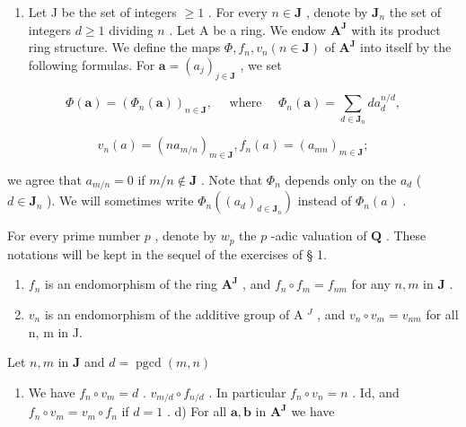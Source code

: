 \begin{enumerate}
\def\labelenumi{\arabic{enumi})}
\setcounter{enumi}{27}
\tightlist
\item
  Let J be the set of integers \(\geqslant 1\) . For every \(n \in \mathbf{J}\) , denote by \(\mathbf{J}_n\) the set of integers \(d \geqslant 1\) dividing \(n\) . Let A be a ring. We endow \(\mathbf{A}^{\mathbf{J}}\) with its product ring structure. We define the maps \(\Phi, f_n, v_n (n \in \mathbf{J})\) of \(\mathbf{A}^{\mathbf{J}}\) into itself by the following formulas. For \(\boldsymbol{a} = (a_j)_{j \in \mathbf{J}}\) , we set
\end{enumerate}

\[
\Phi (\boldsymbol {a}) = \left(\Phi_ {n} (\boldsymbol {a})\right) _ {n \in \mathbf {J}}, \quad \text { where } \quad \Phi_ {n} (\boldsymbol {a}) = \sum_ {d \in \mathbf {J} _ {n}} d a _ {d} ^ {n / d},
\]

\[
v _ {n} (a) = \left(n a _ {m / n}\right) _ {m \in \mathbf {J}}, f _ {n} (a) = \left(a _ {m n}\right) _ {m \in \mathbf {J}};
\]

we agree that \(a_{m/n} = 0\) if \(m/n \notin \mathbf{J}\) . Note that \(\Phi_n\) depends only on the \(a_d\) ( \(d \in \mathbf{J}_n\) ). We will sometimes write \(\Phi_n((a_d)_{d \in \mathbf{J}_n})\) instead of \(\Phi_n(a)\) .

For every prime number \(p\) , denote by \(w_{p}\) the \(p\) -adic valuation of \(\mathbf{Q}\) . These notations will be kept in the sequel of the exercises of § 1.

\begin{enumerate}
\def\labelenumi{\alph{enumi})}
\item
  \(f_{n}\) is an endomorphism of the ring \(\mathbf{A}^{\mathbf{J}}\) , and \(f_{n} \circ f_{m} = f_{nm}\) for any \(n, m\) in \(\mathbf{J}\) .
\item
  \(v_{n}\) is an endomorphism of the additive group of A \(^{J}\) , and \(v_{n} \circ v_{m} = v_{nm}\) for all n, m in J.
\end{enumerate}

Let \(n, m\) in \(\mathbf{J}\) and \(d = \operatorname{pgcd}(m, n)\)

\begin{enumerate}
\def\labelenumi{\alph{enumi})}
\setcounter{enumi}{2}
\tightlist
\item
  We have \(f_{n} \circ v_{m} = d\) . \(v_{m/d} \circ f_{n/d}\) . In particular \(f_{n} \circ v_{n} = n\) . Id, and \(f_{n} \circ v_{m} = v_{m} \circ f_{n}\) if \(d = 1\) . d) For all \(\boldsymbol{a}, \boldsymbol{b}\) in \(\mathbf{A}^{\mathbf{J}}\) we have
\end{enumerate}

